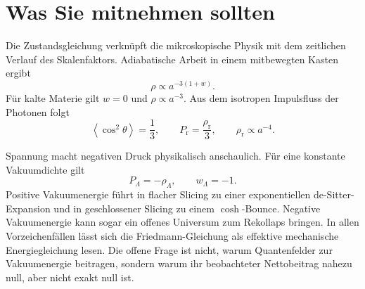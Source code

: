 \section{Was Sie mitnehmen sollten}

Die Zustandsgleichung verknüpft die mikroskopische Physik mit dem zeitlichen Verlauf des Skalenfaktors. Adiabatische Arbeit in einem mitbewegten Kasten ergibt
\[
\rho\propto a^{-3(1+w)}.
\]
Für kalte Materie gilt \(w=0\) und \(\rho\propto a^{-3}\). Aus dem isotropen Impulsfluss der Photonen folgt
\[
\left\langle\cos^2\theta\right\rangle=\frac13,
\qquad
P_{\mathrm r}=\frac{\rho_{\mathrm r}}{3},
\qquad
\rho_{\mathrm r}\propto a^{-4}.
\]

Spannung macht negativen Druck physikalisch anschaulich. Für eine konstante Vakuumdichte gilt
\[
P_\Lambda=-\rho_\Lambda,
\qquad
w_\Lambda=-1.
\]
Positive Vakuumenergie führt in flacher Slicing zu einer exponentiellen de-Sitter-Expansion und in geschlossener Slicing zu einem \(\cosh\)-Bounce. Negative Vakuumenergie kann sogar ein offenes Universum zum Rekollaps bringen. In allen Vorzeichenfällen lässt sich die Friedmann-Gleichung als effektive mechanische Energiegleichung lesen. Die offene Frage ist nicht, warum Quantenfelder zur Vakuumenergie beitragen, sondern warum ihr beobachteter Nettobeitrag nahezu null, aber nicht exakt null ist.
